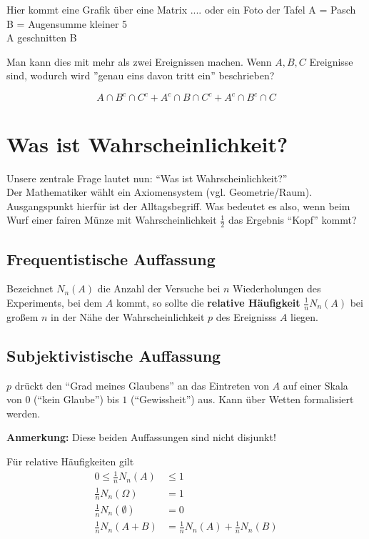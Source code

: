 Hier kommt eine Grafik über eine Matrix .... oder ein Foto der Tafel
A = Pasch\\
B = Augensumme kleiner 5\\
A geschnitten B

Man kann dies mit mehr als zwei Ereignissen machen.
Wenn $A,B,C$ Ereignisse sind, wodurch wird ''genau eins davon tritt ein'' beschrieben?

\begin{equation*}
A \cap B^c \cap C^c + A^c \cap  B \cap C^c + A^c \cap B^c \cap C
\end{equation*}

\section{Was ist Wahrscheinlichkeit?}

Unsere zentrale Frage lautet nun: ``Was ist Wahrscheinlichkeit?''\\
Der Mathematiker wählt ein Axiomensystem (vgl. Geometrie/Raum).
Ausgangspunkt hierfür ist der Alltagsbegriff.
Was bedeutet es also, wenn beim Wurf einer fairen Münze mit Wahrscheinlichkeit $\frac{1}{2}$ das Ergebnis ``Kopf'' kommt?\\

\subsection{Frequentistische Auffassung}

Bezeichnet $N_n(A)$ die Anzahl der Versuche bei $n$ Wiederholungen des Experiments, bei dem $A$ kommt, so sollte die \textbf{relative Häufigkeit} $\frac{1}{n} N_n(A)$ bei großem $n$ in der Nähe der Wahrscheinlichkeit $p$ des Ereignisss $A$ liegen.

\subsection{Subjektivistische Auffassung}

$p$ drückt den ``Grad meines Glaubens'' an das Eintreten von $A$ auf einer Skala von $0$ (``kein Glaube'') bis $1$ (``Gewissheit'') aus.
Kann über Wetten formalisiert werden.

\noindent \textbf{Anmerkung:} Diese beiden Auffassungen sind nicht disjunkt!

Für relative Häufigkeiten gilt
\begin{align*}
0 \leq \frac{1}{n} N_n(A) & \leq 1 \\
\frac{1}{n} N_n(\Omega) & = 1 \\
\frac{1}{n} N_n(\emptyset) & = 0\\
\frac{1}{n} N_n(A+B) & = \frac{1}{n} N_n(A) + \frac{1}{n} N_n(B)
\end{align*}

